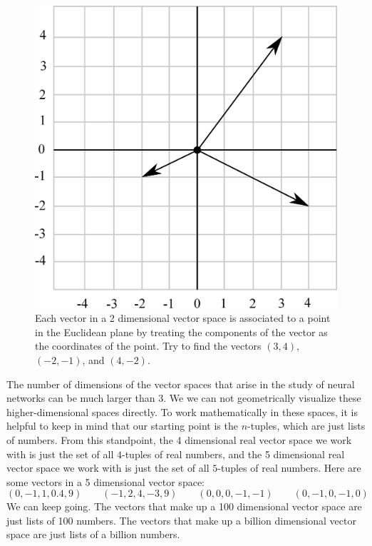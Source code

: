 \begin{figure}[h]
\centering
\includegraphics[scale=0.175]{./images/grid2.png}
\caption[Scott Hotton.]{Each vector in a 2 dimensional vector space is associated to a point 
in the Euclidean plane by treating the components of the vector as the 
coordinates of the point. Try to find the vectors $(3,4)$, $(-2,-1)$, and 
$(4,-2)$.} 
\label{2d}
\end{figure}

   The number of dimensions of the vector spaces that arise in the study of 
neural networks can be much larger than 3. We we can not geometrically visualize these higher-dimensional spaces directly. To work mathematically in 
these spaces, it is helpful to keep in mind that our starting point is the 
$n$-tuples, which are just lists of numbers. From this standpoint, the 4 
dimensional real vector space we work with is just the set of all $4$-tuples of
real numbers, and the 5 dimensional real vector space we work with is just the 
set of all $5$-tuples of real numbers. Here are some vectors in a 5 
dimensional vector space:
\begin{equation*}
    (0,-1, 1, 0.4, 9)  \qquad
    (-1, 2, 4, -3, 9)  \qquad 
    (0, 0, 0, -1, -1 ) \qquad
    (0, -1, 0, -1, 0 ) 
\end{equation*}
We can keep going. The vectors that make up a 100 dimensional vector space are 
just lists of 100 numbers. The vectors that make up a billion dimensional 
vector space are just lists of a billion numbers. 

